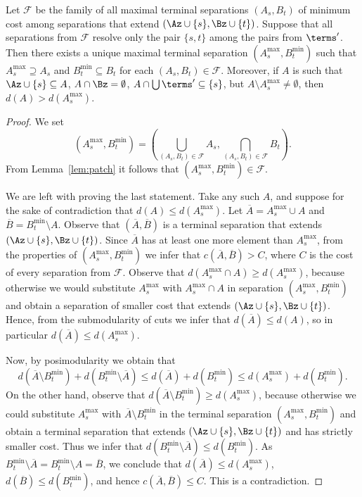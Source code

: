 \begin{lemma}\label{lem:pushing}
Let $\mathcal{F}$ be the family of all maximal terminal separations $(A_s,B_t)$ of minimum cost among separations that extend $(\Az\cup \{s\},\Bz\cup \{t\})$. Suppose that all separations from $\mathcal{F}$ resolve only the pair $\{s,t\}$ among the pairs from $\terms'$. Then there exists a unique maximal terminal separation $(A_s^{\max},B_t^{\min})$ such that $A_s^{\max}\supseteq A_s$ and $B_t^{\min}\subseteq B_t$ for each $(A_s,B_t)\in \mathcal{F}$. Moreover, if $A$ is such that $\Az\cup \{s\}\subseteq A$, $A\cap \Bz=\emptyset$, $A \cap \bigcup \terms' \subseteq \{s\}$, but $A\setminus A_s^{\max}\neq \emptyset$, then $d(A)>d(A_s^{\max})$.
\end{lemma}
\begin{proof}
We set 
$$(A_s^{\max},B_t^{\min})=\left(\bigcup_{(A_s,B_t)\in \mathcal{F}} A_s,\bigcap_{(A_s,B_t)\in \mathcal{F}} B_t\right).$$
From Lemma~\ref{lem:patch} it follows that $(A_s^{\max},B_t^{\min})\in \mathcal{F}$. 

\newcommand{\oA}{\overline{A}}
\newcommand{\oB}{\overline{B}}

We are left with proving the last statement. Take any such $A$, and suppose for the sake of contradiction that $d(A)\leq d(A_s^{\max})$. Let $\oA=A_s^{\max}\cup A$ and $\oB=B_t^{\min}\setminus A$. Observe that $(\oA,\oB)$ is a terminal separation that extends $(\Az\cup \{s\},\Bz\cup \{t\})$. Since $\oA$ has at least one more element than $A_s^{\max}$, from the properties of $(A_s^{\max},B_t^{\min})$ we infer that $c(\oA,\oB)>C$, where $C$ is the cost of every separation from $\mathcal{F}$. Observe that $d(A_s^{\max}\cap A)\geq d(A_s^{\max})$, because otherwise we would substitute $A_s^{\max}$ with $A_s^{\max}\cap A$ in separation $(A_s^{\max},B_t^{\min})$ and obtain a separation of smaller cost that extends $(\Az\cup \{s\},\Bz\cup \{t\})$. Hence, from the submodularity of cuts we infer that $d(\oA)\leq d(A)$, so in particular $d(\oA)\leq d(A_s^{\max})$.

Now, by posimodularity we obtain that
$$d(\oA\setminus B_t^{\min})+d(B_t^{\min}\setminus \oA)\leq d(\oA)+d(B_t^{\min})\leq d(A_s^{\max})+d(B_t^{\min}).$$
On the other hand, observe that $d(\oA\setminus B_t^{\min})\geq d(A_s^{\max})$, because otherwise we could substitute $A_s^{\max}$ with $\oA\setminus B_t^{\min}$ in the terminal separation $(A_s^{\max},B_t^{\min})$ and obtain a terminal separation that extends $(\Az\cup \{s\},\Bz\cup \{t\})$ and has strictly smaller cost. Thus we infer that $d(B_t^{\min}\setminus \oA)\leq d(B_t^{\min})$. As $B_t^{\min}\setminus \oA=B_t^{\min}\setminus A=\oB$, we conclude that $d(\oA)\leq d(A_s^{\max})$, $d(\oB)\leq d(B_t^{\min})$, and hence $c(\oA,\oB)\leq C$. This is a contradiction.
\end{proof}

